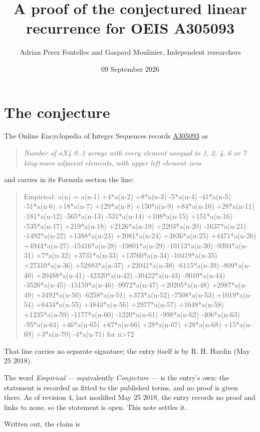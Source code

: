 \documentclass[11pt]{article}
\title{A proof of the conjectured linear recurrence for OEIS A305093}
\author{Adrian Perez Fontelles and Gaspard Moulinier, Independent researchers}
\date{09 September 2026}
\theoremstyle{definition}
\begin{document}
\maketitle
\section{The conjecture}

The Online Encyclopedia of Integer Sequences records \href{https://oeis.org/A305093}{A305093} as

\begin{quote}\itshape Number of nX4 0..1 arrays with every element unequal to 1, 2, 4, 6 or 7 king-move adjacent elements, with upper left element zero\end{quote}

and carries in its Formula section the line:

\begin{quote}\ttfamily Empirical: a(n) = a(n-1) +4*a(n-2) +8*a(n-3) -5*a(n-4) -41*a(n-5) -51*a(n-6) +18*a(n-7) +129*a(n-8) +150*a(n-9) +84*a(n-10) +28*a(n-11) -181*a(n-12) -565*a(n-13) -531*a(n-14) +108*a(n-15) +151*a(n-16) -535*a(n-17) +219*a(n-18) +2126*a(n-19) +2203*a(n-20) -1637*a(n-21) -1492*a(n-22) +1388*a(n-23) +2081*a(n-24) +3836*a(n-25) +4471*a(n-26) +4944*a(n-27) -15416*a(n-28) -19801*a(n-29) -10113*a(n-30) -9394*a(n-31) +7*a(n-32) +3731*a(n-33) +13760*a(n-34) -10419*a(n-35) +27310*a(n-36) +52883*a(n-37) +22041*a(n-38) -6115*a(n-39) -809*a(n-40) +20488*a(n-41) -42320*a(n-42) -30422*a(n-43) -9010*a(n-44) -3526*a(n-45) -15159*a(n-46) -9972*a(n-47) +20205*a(n-48) +2987*a(n-49) +3492*a(n-50) -6258*a(n-51) +373*a(n-52) -7508*a(n-53) +1019*a(n-54) +6434*a(n-55) +4843*a(n-56) +2977*a(n-57) +1648*a(n-58) +1235*a(n-59) -1177*a(n-60) -1220*a(n-61) -998*a(n-62) -406*a(n-63) -95*a(n-64) +46*a(n-65) +67*a(n-66) +28*a(n-67) +28*a(n-68) +15*a(n-69) +3*a(n-70) -4*a(n-71) for n>72\end{quote}

That line carries no separate signature; the entry itself is by R. H. Hardin (May 25 2018).

The word {\itshape Empirical} --- equivalently {\itshape Conjecture} --- is the entry's own: the statement is recorded as fitted to the published terms, and no proof is given there. As of revision 4, last modified May 25 2018, the entry records no proof and links to none, so the statement is open. This note settles it.

Written out, the claim is
\end{document}
